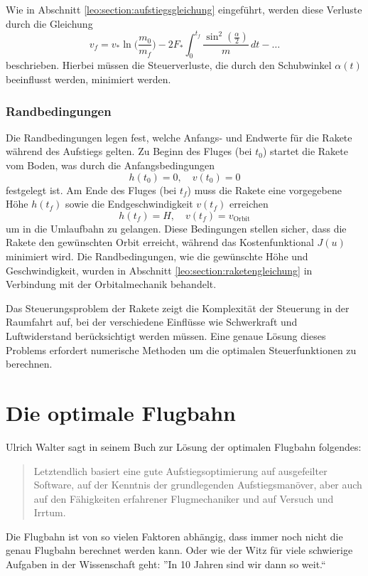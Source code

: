 Wie in Abschnitt \ref{leo:section:aufstiegsgleichung} eingeführt, werden diese Verluste durch die Gleichung
\[
v_f = v_* \ln \biggl(\frac{m_0}{m_f}\biggr) - 2F_* \int_0^{t_f} \frac{\sin^2\left(\frac{\alpha}{2}\right)}{m} \, dt - \dots
\]
beschrieben. Hierbei müssen die Steuerverluste, die durch den Schubwinkel \( \alpha(t) \) beeinflusst werden, minimiert werden.

\subsubsection{Randbedingungen}
Die Randbedingungen legen fest, welche Anfangs- und Endwerte für
die Rakete während des Aufstiegs gelten. Zu Beginn des Fluges (bei
\( t_0 \)) startet die Rakete vom Boden, was durch die Anfangsbedingungen
\[
h(t_0) = 0, \quad v(t_0) = 0
\]
festgelegt ist. 
Am Ende des Fluges (bei \( t_f \)) muss die Rakete eine vorgegebene Höhe \( h(t_f) \) sowie die Endgeschwindigkeit \( v(t_f) \) erreichen
\[
h(t_f) = H, \quad v(t_f) = v_{\text{Orbit}}
\]
um in die Umlaufbahn zu gelangen.
Diese Bedingungen stellen sicher, dass die Rakete den gewünschten
Orbit erreicht, während das Kostenfunktional \( J(u) \) minimiert
wird.
Die Randbedingungen, wie die gewünschte Höhe und Geschwindigkeit,
wurden in Abschnitt \ref{leo:section:raketengleichung} in Verbindung
mit der Orbitalmechanik behandelt.
%

Das Steuerungsproblem der Rakete zeigt die Komplexität der Steuerung
in der Raumfahrt auf, bei der verschiedene Einflüsse wie Schwerkraft
und Luftwiderstand berücksichtigt werden müssen. Eine genaue Lösung
dieses Problems erfordert numerische Methoden um die optimalen
Steuerfunktionen zu berechnen.

\section{Die optimale Flugbahn}

Ulrich Walter sagt in seinem Buch \cite[section 6.4.7]{leo:astronautics} zur Lösung der optimalen Flugbahn folgendes:
\begin{quote}
Letztendlich basiert eine gute Aufstiegsoptimierung auf ausgefeilter Software, auf der Kenntnis der grundlegenden Aufstiegsmanöver, aber auch auf den Fähigkeiten erfahrener Flugmechaniker und auf Versuch und Irrtum.
\end{quote}
Die Flugbahn ist von so vielen Faktoren abhängig, dass immer noch nicht die genau Flugbahn berechnet werden kann. 
Oder wie der Witz für viele schwierige Aufgaben in der Wissenschaft geht: ''In 10 Jahren sind wir dann so weit.``

